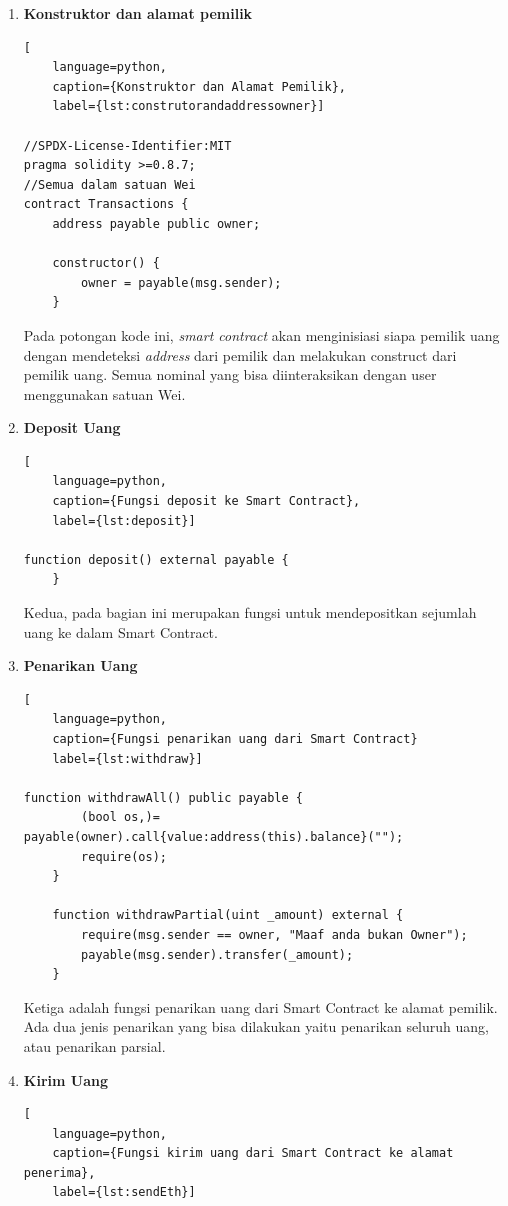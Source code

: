 \begin{enumerate}
\item{\textbf{Konstruktor dan alamat pemilik}}

\begin{lstlisting}[
	language=python,
	caption={Konstruktor dan Alamat Pemilik},
	label={lst:construtorandaddressowner}]

//SPDX-License-Identifier:MIT
pragma solidity >=0.8.7;
//Semua dalam satuan Wei
contract Transactions {
    address payable public owner;

    constructor() {
        owner = payable(msg.sender);
    }
\end{lstlisting}

Pada potongan kode ini, \emph{smart contract} akan menginisiasi siapa pemilik uang dengan mendeteksi \emph{address} dari pemilik dan melakukan construct dari pemilik uang. Semua nominal yang bisa diinteraksikan dengan user menggunakan satuan Wei.

\item{\textbf{Deposit Uang}}
\begin{lstlisting}[
	language=python,
	caption={Fungsi deposit ke Smart Contract},
	label={lst:deposit}]

function deposit() external payable {
    }
\end{lstlisting}
Kedua, pada bagian ini merupakan fungsi untuk mendepositkan sejumlah uang ke dalam Smart Contract.

\item{\textbf{Penarikan Uang}}
\begin{lstlisting}[
	language=python,
	caption={Fungsi penarikan uang dari Smart Contract}
	label={lst:withdraw}]

function withdrawAll() public payable {
        (bool os,)= payable(owner).call{value:address(this).balance}("");
        require(os);
    }

    function withdrawPartial(uint _amount) external {
        require(msg.sender == owner, "Maaf anda bukan Owner");    
        payable(msg.sender).transfer(_amount);
    }
\end{lstlisting}

Ketiga adalah fungsi penarikan uang dari Smart Contract ke alamat pemilik. Ada dua jenis penarikan yang bisa dilakukan yaitu penarikan seluruh uang, atau penarikan parsial.

\item{\textbf{Kirim Uang}}
\begin{lstlisting}[
	language=python,
	caption={Fungsi kirim uang dari Smart Contract ke alamat penerima},
	label={lst:sendEth}]


\end{lstlisting}
\end{enumerate}

